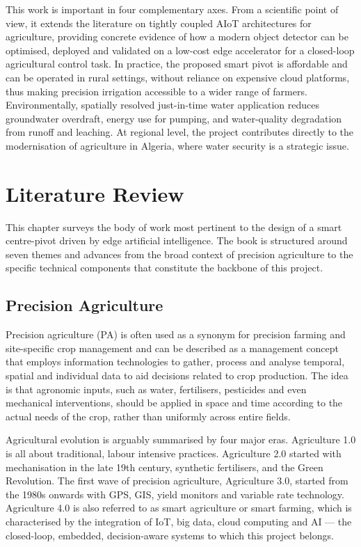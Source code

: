 \documentclass[12pt,a4paper]{report}
\begin{document}
This work is important in four complementary axes. From a scientific point of view, it extends the literature on tightly coupled AIoT architectures for agriculture, providing concrete evidence of how a modern object detector can be optimised, deployed and validated on a low-cost edge accelerator for a closed-loop agricultural control task. In practice, the proposed smart pivot is affordable and can be operated in rural settings, without reliance on expensive cloud platforms, thus making precision irrigation accessible to a wider range of farmers. Environmentally, spatially resolved just-in-time water application reduces groundwater overdraft, energy use for pumping, and water-quality degradation from runoff and leaching. At regional level, the project contributes directly to the modernisation of agriculture in Algeria, where water security is a strategic issue.

\chapter{Literature Review}
\pagestyle{fancy}
\thispagestyle{empty}

This chapter surveys the body of work most pertinent to the design of a smart centre-pivot driven by edge artificial intelligence. The book is structured around seven themes and advances from the broad context of precision agriculture to the specific technical components that constitute the backbone of this project.

\section{Precision Agriculture}

Precision agriculture (PA) is often used as a synonym for precision farming and site-specific crop management and can be described as a management concept that employs information technologies to gather, process and analyse temporal, spatial and individual data to aid decisions related to crop production. The idea is that agronomic inputs, such as water, fertilisers, pesticides and even mechanical interventions, should be applied in space and time according to the actual needs of the crop, rather than uniformly across entire fields.

Agricultural evolution is arguably summarised by four major eras. Agriculture 1.0 is all about traditional, labour intensive practices. Agriculture 2.0 started with mechanisation in the late 19th century, synthetic fertilisers, and the Green Revolution. The first wave of precision agriculture, Agriculture 3.0, started from the 1980s onwards with GPS, GIS, yield monitors and variable rate technology. Agriculture 4.0 is also referred to as smart agriculture or smart farming, which is characterised by the integration of IoT, big data, cloud computing and AI --- the closed-loop, embedded, decision-aware systems to which this project belongs.
\end{document}
